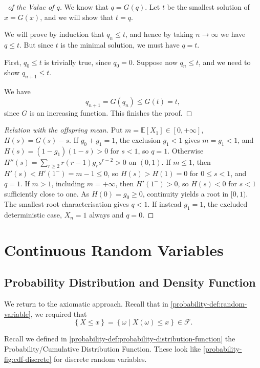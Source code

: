 \documentclass[11pt]{article}
\numberwithin{equation}{section}
\theoremstyle{definition}
\theoremstyle{remark}
\newcommand{\pqty}[1]{\left(#1\right)}
\newcommand{\Bqty}[1]{\left\{#1\right\}}
\newcommand{\set}[2]{\left\{#1\mid #2\right\}}
\newcommand{\eventSpace}{\mathcal F}
\newcommand{\Expt}{\mathbb E}
\begin{document}
\begin{proof}[\proofname\ of the Value of \(q\)]\label{probability-proof-052}
    We know that \(q = G\pqty{q}\). Let \(t\) be the smallest solution of \(x = G\pqty{x}\), and we will show that \(t = q\).

    We will prove by induction that \(q_n \leq t\), and hence by taking \(n \to \infty\) we have \(q \leq t\). But since \(t\) is the minimal solution, we must have \(q = t\).

    First, \(q_0 \leq t\) is trivially true, since \(q_0 = 0\). Suppose now \(q_n \leq t\), and we need to show \(q_{n + 1} \leq t\).

    We have
    \[
        q_{n + 1} = G\pqty{q_n} \leq G\pqty{t} = t,
    \]
    since \(G\) is an increasing function. This finishes the proof.
\end{proof}

\begin{proof}[Relation with the offspring mean]\label{probability-proof-053}
Put \(m=\Expt[X_1]\in[0,+\infty]\), \(H(s)=G(s)-s\).
If \(g_0+g_1=1\), the exclusion \(g_1<1\) gives \(m=g_1<1\), and
\(H(s)=(1-g_1)(1-s)>0\) for \(s<1\), so \(q=1\).
Otherwise \(H''(s)=\sum_{r\ge2}r(r-1)g_rs^{r-2}>0\) on \((0,1)\).
If \(m\le1\), then \(H'(s)<H'(1^-)=m-1\le0\), so \(H(s)>H(1)=0\)
for \(0\le s<1\), and \(q=1\).
If \(m>1\), including \(m=+\infty\), then
\(H'(1^-)>0\), so \(H(s)<0\) for \(s<1\) sufficiently close to one.
As \(H(0)=g_0\ge0\), continuity yields a root in \([0,1)\).
The smallest-root characterisation gives \(q<1\).
If instead \(g_1=1\), the excluded deterministic case, \(X_n=1\) always and \(q=0\).
\end{proof}

\section{Continuous Random Variables}\label{probability-section-11}

\subsection{Probability Distribution and Density Function}

We return to the axiomatic approach. Recall that in \autoref{probability-def:random-variable}, we required that
\[
    \Bqty{X \leq x} = \set{\omega}{X\pqty{\omega} \leq x} \in \eventSpace.
\]

Recall we defined in \autoref{probability-def:probability-distribution-function} the Probability/Cumulative Distribution Function. These look like \autoref{probability-fig:cdf-discrete} for discrete random variables.
\end{document}
